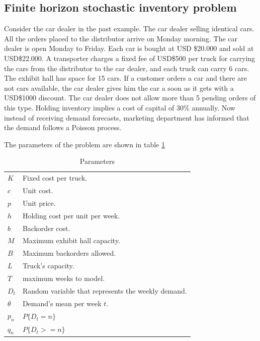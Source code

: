 \documentclass[11pt]{article}
\newcommand{\lstinclude}[1]{
	
}
\begin{document}
\lstinclude{WagnerWhitin.java}

\subsection{Finite horizon stochastic inventory problem}

Consider the car dealer in the past example. The car dealer selling identical cars. All the orders placed to the distributor arrive on Monday morning. The car dealer is open Monday to Friday. Each car is bought at USD \$20.000 and sold at USD\$22.000. A transporter charges a fixed fee of USD\$500 per truck for carrying the cars from the distributor to the car dealer, and each truck can carry 6 cars. The exhibit hall has space for 15 cars. If a customer orders a car and there are not cars available, the car dealer gives him the car a soon as it gets with a USD\$1000 discount. The car dealer does not allow more than 5 pending orders of this type. Holding inventory implies a cost of capital of 30\% annually. Now instead of receiving demand forecasts, marketing department has informed that the demand follows a Poisson process.

The parameters of the problem are shown in table \ref{tab:parameters2}

\begin{table}[ht]
\begin{center}
\begin{tabular}{ll}
$K$ & Fixed cost per truck.\\
$c$ & Unit cost.\\
$p$ & Unit price.\\
$h$ & Holding cost per unit per week.\\
$b$ & Backorder cost.\\
$M$ & Maximum exhibit hall capacity.\\
$B$ & Maximum backorders allowed.\\
$L$ & Truck's capacity.\\
$T$ & maximum weeks to model.\\
$D_t$ & Random variable that represents the weekly demand.\\
$\theta$ & Demand's mean per week $t$.\\
$p_n$ & $P\{D_t = n\}$\\
$q_n$ & $P\{D_t >= n\}$
\end{tabular}
\caption[\textbf{Parameters:}]{Parameters}
\label{tab:parameters2}
\end{center}
\end{table}
\end{document}
